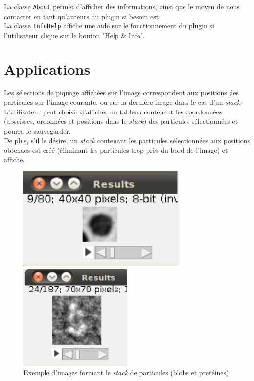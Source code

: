 La classe \texttt{About} permet d'afficher des informations, ainsi que le moyen de nous contacter en tant qu'auteurs du plugin si besoin est. \\

La classe \texttt{InfoHelp} affiche une aide sur le fonctionnement du plugin si l'utilisateur  clique sur le bouton "Help \& Info". 

\section{Applications}

Les sélections de piquage affichées sur l'image correspondent aux positions des particules sur l'image courante, ou sur la dernière image dans le cas d'un \textit{stack}. \\
L'utilisateur peut choisir d'afficher un tableau contenant les coordonnées (abscisses, ordonnées et positions dans le \textit{stack}) des particules sélectionnées et pourra le sauvegarder. \\

De plus, s'il le désire, un \textit{stack} contenant les particules sélectionnées aux positions obtenues est créé (éliminant les particules trop près du bord de l'image) et affiché.

\begin{figure}[!ht]
\begin{center}
 \begin{minipage}{.450\linewidth}
  \includegraphics[width=0.75\textwidth]{cropblob.png}  
 \end{minipage} \hfill
\begin{minipage}{.450\linewidth}
  \includegraphics[width=0.5\textwidth]{cropprotDog.png}   
 \end{minipage} \hfill
\caption{Exemple d'images formant le \textit{stack} de particules (blobs et protéines)}
\end{center}
\end{figure}

